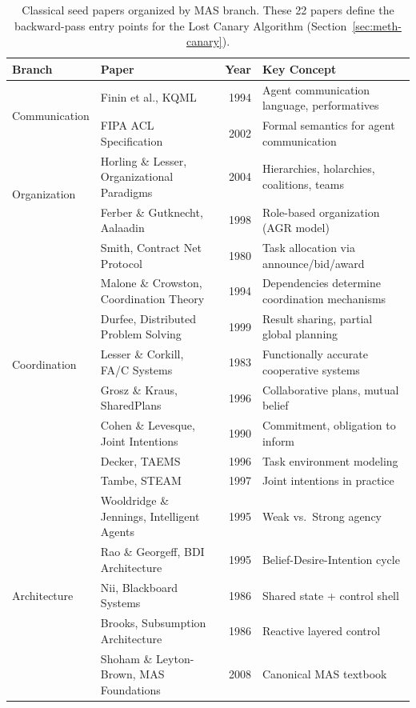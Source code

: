 \documentclass{article}
\begin{document}
\begin{table}[h]
\centering
\caption{Classical seed papers organized by MAS branch. These 22 papers define the
backward-pass entry points for the Lost Canary Algorithm
(Section~\ref{sec:meth-canary}).}
\label{tab:classical-seeds}
\footnotesize
\begin{tabular}{@{} l l r p{5.5cm} @{}}
\toprule
\textbf{Branch} & \textbf{Paper} & \textbf{Year} & \textbf{Key Concept} \\
\midrule
\multirow{2}{*}{Communication}
  & Finin et al., KQML & 1994 & Agent communication language, performatives \\
  & FIPA ACL Specification & 2002 & Formal semantics for agent communication \\
\midrule
\multirow{2}{*}{Organization}
  & Horling \& Lesser, Organizational Paradigms & 2004 & Hierarchies, holarchies, coalitions, teams \\
  & Ferber \& Gutknecht, Aalaadin & 1998 & Role-based organization (AGR model) \\
\midrule
\multirow{8}{*}{Coordination}
  & Smith, Contract Net Protocol & 1980 & Task allocation via announce/bid/award \\
  & Malone \& Crowston, Coordination Theory & 1994 & Dependencies determine coordination mechanisms \\
  & Durfee, Distributed Problem Solving & 1999 & Result sharing, partial global planning \\
  & Lesser \& Corkill, FA/C Systems & 1983 & Functionally accurate cooperative systems \\
  & Grosz \& Kraus, SharedPlans & 1996 & Collaborative plans, mutual belief \\
  & Cohen \& Levesque, Joint Intentions & 1990 & Commitment, obligation to inform \\
  & Decker, TAEMS & 1996 & Task environment modeling \\
  & Tambe, STEAM & 1997 & Joint intentions in practice \\
\midrule
\multirow{5}{*}{Architecture}
  & Wooldridge \& Jennings, Intelligent Agents & 1995 & Weak vs.\ Strong agency \\
  & Rao \& Georgeff, BDI Architecture & 1995 & Belief-Desire-Intention cycle \\
  & Nii, Blackboard Systems & 1986 & Shared state + control shell \\
  & Brooks, Subsumption Architecture & 1986 & Reactive layered control \\
  & Shoham \& Leyton-Brown, MAS Foundations & 2008 & Canonical MAS textbook \\

\end{tabular}
\end{table}
\end{document}
